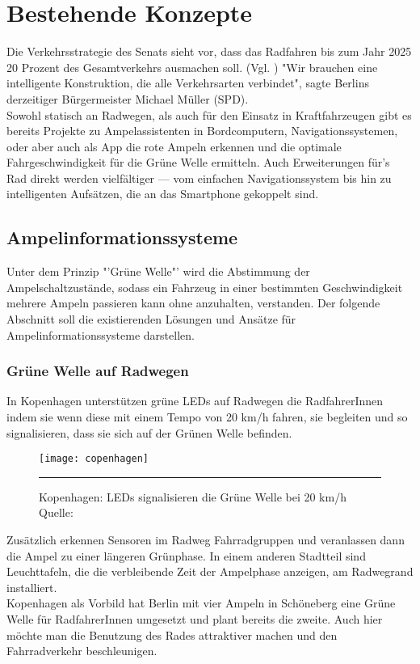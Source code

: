 \chapter{\label{chap:state}Bestehende Konzepte}
Die Verkehrsstrategie des Senats sieht vor, dass das Radfahren bis zum Jahr 2025 20 Prozent des Gesamtverkehrs ausmachen soll. (Vgl. \cite{Mopo})
"Wir brauchen eine intelligente Konstruktion, die alle Verkehrsarten verbindet", sagte Berlins derzeitiger Bürgermeister Michael Müller (SPD).\\
Sowohl statisch an Radwegen, als auch für den Einsatz in Kraftfahrzeugen gibt es bereits Projekte zu Ampelassistenten in Bordcomputern, Navigationssystemen, oder aber auch als \gls{App} die rote Ampeln erkennen und die optimale Fahrgeschwindigkeit für die Grüne Welle ermitteln. Auch Erweiterungen für's Rad direkt werden vielfältiger --- vom einfachen Navigationssystem bis hin zu intelligenten Aufsätzen, die an das \gls{Smartphone} gekoppelt sind.
\section{Ampelinformationssysteme}
Unter dem Prinzip "'Grüne Welle"' wird die Abstimmung der Ampelschaltzustände, sodass ein Fahrzeug in einer bestimmten Geschwindigkeit mehrere Ampeln passieren kann ohne anzuhalten, verstanden. Der folgende Abschnitt soll die existierenden Lösungen und Ansätze für Ampelinformationssysteme darstellen.
\subsection{Grüne Welle auf Radwegen}
In Kopenhagen unterstützen grüne \glspl{LED} auf Radwegen die RadfahrerInnen indem sie wenn diese mit einem Tempo von 20 km/h fahren, sie begleiten und so signalisieren, dass sie sich auf der Grünen Welle befinden. 
\begin{figure}[H]  
    \centering  
    \texttt{[image: copenhagen]} 
    \rule{35em}{0.5pt}
    \label{fig:copenhagen}
    \caption[Grüne Welle durch \glspl{LED}]{Kopenhagen: \glspl{LED} signalisieren die Grüne Welle bei 20 km/h  Quelle: \cite{NYT}}
\end{figure}
Zusätzlich erkennen Sensoren im Radweg Fahrradgruppen und veranlassen dann die Ampel zu einer längeren Grünphase. In einem anderen Stadtteil sind Leuchttafeln, die die verbleibende Zeit der Ampelphase anzeigen, am Radwegrand installiert\cite{KopIng}.\\
Kopenhagen als Vorbild hat Berlin mit vier Ampeln in Schöneberg eine Grüne Welle für RadfahrerInnen umgesetzt und plant bereits die zweite\cite{BZ}. Auch hier möchte man die Benutzung des Rades attraktiver machen und den Fahrradverkehr beschleunigen.
